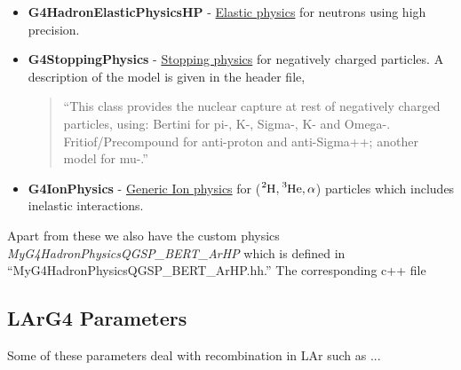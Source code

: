 \documentclass[8pt]{refart}
\begin{document}
\begin{itemize}
    \item \textbf{G4HadronElasticPhysicsHP} - \href{https://apc.u-paris.fr/~franco/g4doxy/html/classG4HadronElasticPhysicsHP.html}{Elastic physics} for neutrons using high precision.
    \item \textbf{G4StoppingPhysics} - \href{https://apc.u-paris.fr/~franco/g4doxy/html/classG4StoppingPhysics.html}{Stopping physics} for negatively charged particles.  A description of the model is given in the header file,
    \begin{quotation}
    ``This class provides the nuclear capture at rest of negatively charged particles, using: Bertini for pi-, K-, Sigma-, K- and Omega-.  Fritiof/Precompound for anti-proton and anti-Sigma++; another model for mu-.''
    \end{quotation}
    \item \textbf{G4IonPhysics} - \href{https://apc.u-paris.fr/~franco/g4doxy/html/classG4IonPhysics.html}{Generic Ion physics} for ($\ce{^{2}H},\ce{^{3}He},\alpha$) particles which includes inelastic interactions.
\end{itemize}
Apart from these we also have the custom physics\\
\textit{MyG4HadronPhysicsQGSP\_BERT\_ArHP} which is defined in\\
``MyG4HadronPhysicsQGSP\_BERT\_ArHP.hh.''  The corresponding c++ file 

\subsection{LArG4 Parameters}

Some of these parameters deal with recombination in LAr such as ...
\end{document}

